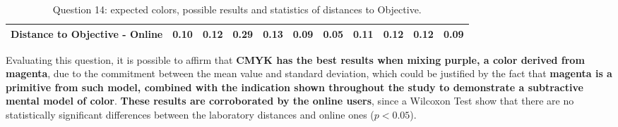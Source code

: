 \begin{table}[H]
{\begin{tabular}{lccccccccccccc}
    \multicolumn{4}{l}{Distance to Objective - Online}                                                                                               & \multicolumn{1}{|c}{0.10}        & \multicolumn{1}{c|}{0.12}    & \multicolumn{1}{|c}{0.29}        & \multicolumn{1}{c|}{0.13}    & \multicolumn{1}{|c}{\textbf{0.09}}       & \multicolumn{1}{c|}{0.05}    & \multicolumn{1}{|c}{0.11}        & \multicolumn{1}{c|}{0.12}    & \multicolumn{1}{|c}{0.12}       & \multicolumn{1}{c|}{0.09}    \\ \hline
    \end{tabular}}
  \caption[Question 14, with expected Results.]{Question 14: expected colors, possible results and statistics of distances to Objective.}
  \vspace{-5pt}
  \label{table:lab_q14_expected}
\end{table}
%
Evaluating this question, it is possible to affirm that \textbf{CMYK has the best results when mixing purple, a color derived from magenta}, due to the commitment between the mean value and standard deviation, which
could be justified by the fact that \textbf{magenta is a primitive from such model, combined with the indication shown throughout the study to demonstrate a subtractive mental model of color}.
\textbf{These results are corroborated by the online users}, since a Wilcoxon Test show that there are no statistically significant differences between the laboratory distances and online ones ($p < 0.05$).
%
